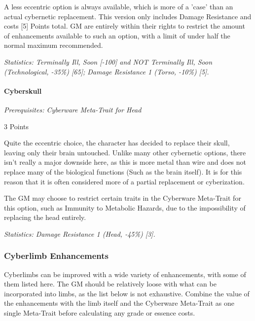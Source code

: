 \begin{multicols*}{3}
	A less eccentric option is always available, which is more of a 'case' than an actual cybernetic replacement. This version only includes Damage Resistance and costs [5] Points total. GM are entirely within their rights to restrict the amount of enhancements available to such an option, with a limit of under half the normal maximum recommended.
	
	\textit{\textcolor{OliveGreen}{Statistics: Terminally Ill, Soon [-100] and NOT Terminally Ill, Soon (Technological, -35\%) [65]; Damage Resistance 1 (Torso, -10\%) [5].}}
	
	\paragraph{Cyberskull}
	\textit{Prerequisites:  Cyberware Meta-Trait for Head}
	\begin{flushright}
		3 Points
	\end{flushright}

	Quite the eccentric choice, the character has decided to replace their skull, leaving only their brain untouched. Unlike many other cybernetic options, there isn't really a major downside here, as this is more metal than wire and does not replace many of the biological functions (Such as the brain itself). It is for this reason that it is often considered more of a partial replacement or cyberization. 
	
	The GM may choose to restrict certain traits in the Cyberware Meta-Trait for this option, such as Immunity to Metabolic Hazards, due to the impossibility of replacing the head entirely.
	
	\textit{\textcolor{OliveGreen}{Statistics: Damage Resistance 1 (Head, -45\%) [3].}}
	
		
	\subsubsection{Cyberlimb Enhancements}
	
	Cyberlimbs can be improved with a wide variety of enhancements, with some of them listed here. The GM should be relatively loose with what can be incorporated into limbs, as the list below is not exhaustive. Combine the value of the enhancements with the limb itself and the Cyberware Meta-Trait as one single Meta-Trait before calculating any grade or essence costs.
	

\end{multicols*}
